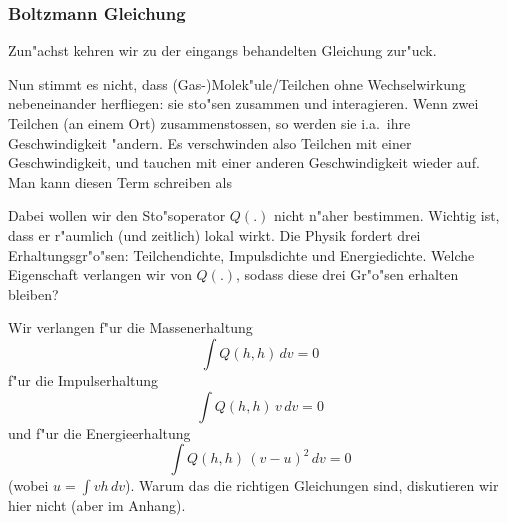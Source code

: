 \subsubsection{ Boltzmann Gleichung}\par
Zun"achst kehren wir zu der eingangs behandelten Gleichung zur"uck.\par
{}\par\medskip
Nun stimmt es nicht, dass (Gas-)Molek"ule/Teilchen ohne Wechselwirkung nebeneinander 
herfliegen: sie sto"sen
zusammen und interagieren. Wenn zwei Teilchen (an einem Ort) zusammenstossen, so 
werden sie i.a.\ ihre Geschwindigkeit "andern. Es verschwinden also Teilchen mit
einer Geschwindigkeit, und tauchen mit einer anderen Geschwindigkeit wieder auf. 
Man kann diesen Term schreiben als \par
{}\par\medskip
Dabei wollen wir den Sto"soperator $Q(.)$ nicht n"aher bestimmen. Wichtig ist, dass 
er r"aumlich (und zeitlich) lokal wirkt. Die Physik fordert drei Erhaltungsgr"o"sen: 
Teilchendichte, Impulsdichte und Energiedichte. Welche Eigenschaft verlangen wir 
von $Q(.)$, sodass diese drei Gr"o"sen erhalten bleiben?

Wir verlangen f"ur die Massenerhaltung
 $$ \int Q(h,h)\, dv = 0$$
f"ur die Impulserhaltung
$$ \int Q(h,h)\, v\, dv = 0$$
und f"ur die Energieerhaltung
$$ \int Q(h,h)\, (v-u)^2\, dv = 0$$
(wobei $u=\int v h\, dv$). Warum das die richtigen Gleichungen sind, 
diskutieren wir hier nicht (aber im Anhang).

